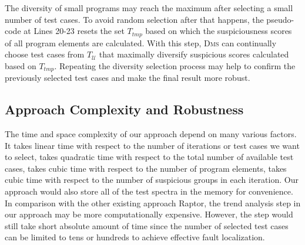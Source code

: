 The diversity of small programs may reach the maximum after selecting a small number of test cases. To avoid random selection
after that happens, the pseudo-code at Lines 20-23 resets the set $T_{tmp}$
based on which the suspiciousness scores of all program elements are calculated. With this step, \textsc{Dms} can
continually choose test cases from $T_{\mathcal{U}}$ that maximally diversify suspicious scores calculated based on $T_{tmp}$.
Repeating the diversity selection process may help to confirm the previously selected test cases and make the final result more robust.






\subsection{Approach Complexity and Robustness}

The time and space complexity of our approach depend on many various factors. It takes linear time with respect to the number of iterations or test cases
we want to select, takes quadratic time with respect to the total number
of available test cases, takes cubic time with respect to the number of program elements, takes cubic time with respect to the number of suspicious
groups in each iteration. Our approach would also store all of the test spectra in
the memory for convenience. In comparison with the other existing approach {\sc Raptor}, the trend analysis step in our approach may be more computationally expensive. However, the step would still take short absolute amount of time since the number of selected test cases can be limited to tens or hundreds to achieve effective fault localization.

